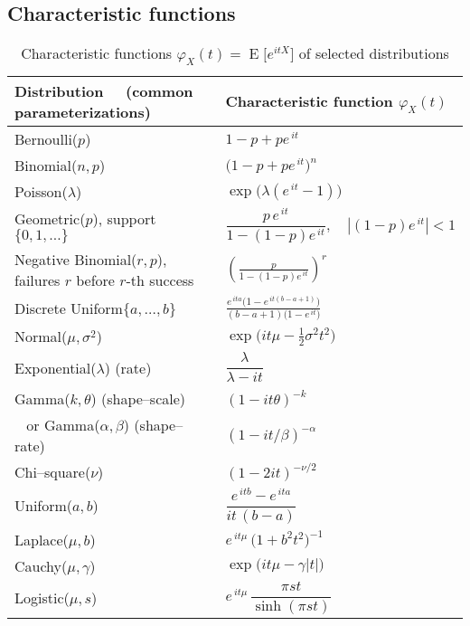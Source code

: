 \documentclass{article}
\begin{document}
\subsection{Characteristic functions}
\begin{table}[ht]
\centering
\caption{Characteristic functions $\varphi_X(t)=\operatorname{E}\bigl[e^{itX}\bigr]$ of selected distributions}
\scriptsize
\renewcommand{\arraystretch}{1.25}
\begin{tabular}{@{}p{4cm} p{9.2cm}@{}}
\toprule
Distribution \ \ (common parameterizations) & Characteristic function $\displaystyle\varphi_X(t)$ \\ 
\midrule
Bernoulli($p$) & $1-p+pe^{\,it}$ \\ \midrule
Binomial($n,p$) & $\bigl(1-p+pe^{\,it}\bigr)^{n}$ \\ \midrule
Poisson($\lambda$) & $\exp\!\bigl(\lambda(e^{\,it}-1)\bigr)$ \\ \midrule
Geometric($p$), support $\{0,1,\dots\}$ & $\dfrac{p\,e^{\,it}}{1-(1-p)e^{\,it}}, \quad |(1-p)e^{\,it}|<1$ \\ \midrule
Negative Binomial($r,p$), failures $r$ before $r$-th success & $\displaystyle\left(\frac{p}{1-(1-p)e^{\,it}}\right)^{\!r}$ \\ \midrule
Discrete Uniform$\{a,\dots,b\}$ & $\displaystyle
\frac{e^{\,ita}\bigl(1-e^{\,it(b-a+1)}\bigr)}{(b-a+1)\bigl(1-e^{\,it}\bigr)}$ \\ \midrule
Normal($\mu,\sigma^{2}$) & $\exp\!\bigl(it\mu-\tfrac{1}{2}\sigma^{2}t^{2}\bigr)$ \\ \midrule
Exponential($\lambda$) (rate) & $\dfrac{\lambda}{\lambda-it}$ \\ \midrule
Gamma($k,\theta$) (shape–scale) & $(1-it\theta)^{-k}$ \\ 
\,\,\,\,\,or Gamma($\alpha,\beta$) (shape–rate) & $(1-it/\beta)^{-\alpha}$ \\ \midrule
Chi–square($\nu$) & $(1-2it)^{-\nu/2}$ \\ \midrule
Uniform($a,b$) & $\dfrac{e^{\,itb}-e^{\,ita}}{it\,(b-a)}$ \\ \midrule
Laplace($\mu,b$) & $e^{\,it\mu}\,\bigl(1+b^{2}t^{2}\bigr)^{-1}$ \\ \midrule
Cauchy($\mu,\gamma$) & $\exp\!\bigl(it\mu-\gamma|t|\bigr)$ \\ \midrule
Logistic($\mu,s$) & $e^{\,it\mu}\,\dfrac{\pi s t}{\sinh(\pi s t)}$ \\ \midrule

\end{tabular}
\end{table}
\end{document}
